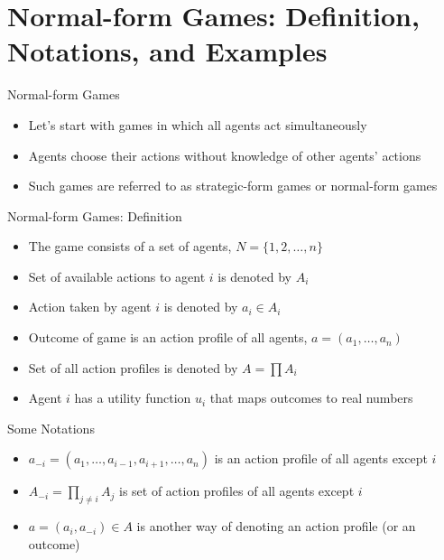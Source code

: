 \documentclass[11pt,aspectratio=169]{beamer}
\subtitle{\vspace{2.1em}Lecture 3: Games in Normal Form}
\begin{document}
 \begin{frame}[plain]
  \titlepage
 \end{frame}
 
 \section{Normal-form Games: Definition, Notations, and Examples}
 
  \begin{frame}{Normal-form Games}
   \begin{itemize}[<+->]  
   \setlength{\itemsep}{1.5em}
    \item Let's start with games in which all agents act simultaneously
    \item Agents choose their actions without knowledge of other agents' actions
    \item Such games are referred to as \alert{strategic-form games} or \alert{normal-form games}
   \end{itemize}
  \end{frame}
  
    \begin{frame}{Normal-form Games: Definition}
   \begin{itemize}[<+->]
   \setlength{\itemsep}{1.5em}
    \item The game consists of a set of agents, $N=\{1,2,\dots,n\}$
    \item Set of available actions to agent $i$ is denoted by $A_i$
    \item Action taken by agent $i$ is denoted by $a_i \in A_i$
    \item Outcome of game is an \alert{action profile} of all agents, $a = (a_1,\dots,a_n)$
    \item Set of all action profiles is denoted by $A = \prod A_i$
    \item Agent $i$ has a utility function $u_i$ that maps outcomes to real numbers
   \end{itemize}
  \end{frame}
  
  \begin{frame}{Some Notations}
   \begin{itemize}
   \setlength{\itemsep}{1.5em}
    \item $a_{-i} = (a_1,\dots,a_{i-1},a_{i+1},\dots,a_n)$ is an action profile of all agents except $i$
    \item $A_{-i} = \prod_{j\ne i}A_j$ is set of action profiles of all agents except $i$
    \item $a = (a_i,a_{-i}) \in A$ is another way of denoting an action profile (or an outcome)
   \end{itemize}
  \end{frame}
  
\end{document}
